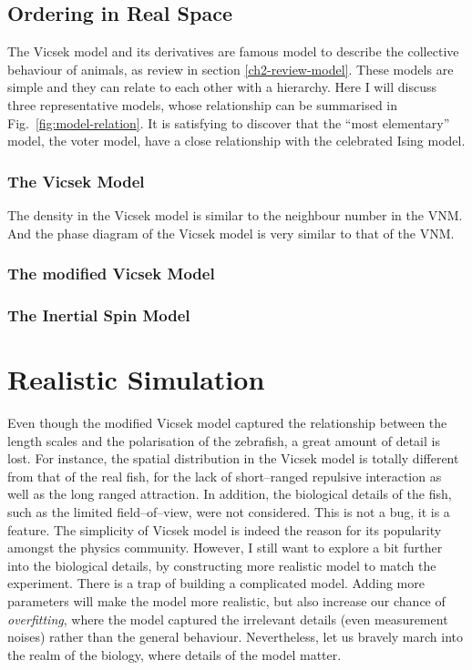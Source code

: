 \documentclass[11pt,twoside]{report}
\begin{document}
\subsection{Ordering in Real Space}

The Vicsek model and its derivatives are famous model to describe the collective behaviour of animals, as review in section \ref{ch2-review-model}. These models are simple and they can relate to each other with a hierarchy. Here I will discuss three representative models, whose relationship can be summarised in Fig.\ \ref{fig:model-relation}. It is satisfying to discover that the ``most elementary'' model, the voter model, have a close relationship with the celebrated Ising model.


\subsubsection*{The Vicsek Model}

The density in the Vicsek model is similar to the neighbour number in the VNM. And the phase diagram of the Vicsek model is very similar to that of the VNM.


\subsubsection*{The modified Vicsek Model}

\subsubsection*{The Inertial Spin Model}

\section{Realistic Simulation}

Even though the modified Vicsek model captured the relationship between the length scales and the polarisation of the zebrafish, a great amount of detail is lost. For instance, the spatial distribution in the Vicsek model is totally different from that of the real fish, for the lack of short--ranged repulsive interaction as well as the long ranged attraction. In addition, the biological details of the fish, such as the limited field--of--view, were not considered. This is not a bug, it is a feature. The simplicity of Vicsek model is indeed the reason for its popularity amongst the physics community. However, I still want to explore a bit further into the biological details, by constructing more realistic model to match the experiment. There is a trap of building a complicated model. Adding more parameters will make the model more realistic, but also increase our chance of \emph{overfitting}, where the model captured the irrelevant details (even measurement noises) rather than the general behaviour. Nevertheless, let us bravely march into the realm of the biology, where details of the model matter.
\end{document}
